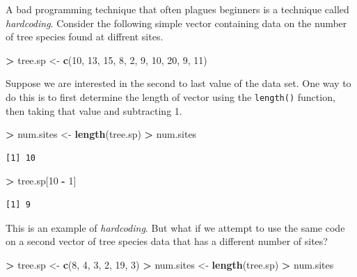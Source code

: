 \documentclass[]{krantz}
\makeatletter
\newenvironment{Shaded}{\begin{snugshade}}{\end{snugshade}}
\newcommand{\DecValTok}[1]{\textcolor[rgb]{0.06,0.06,0.06}{#1}}
\newcommand{\KeywordTok}[1]{\textcolor[rgb]{0.27,0.27,0.27}{\textbf{#1}}}
\newcommand{\NormalTok}[1]{#1}
\newcommand{\OperatorTok}[1]{\textcolor[rgb]{0.43,0.43,0.43}{\textbf{#1}}}
\newcommand{\StringTok}[1]{\textcolor[rgb]{0.5,0.5,0.5}{#1}}
\newenvironment{kframe}{%
\medskip{}
\setlength{\fboxsep}{.8em}
 \def\at@end@of@kframe{}%
 \ifinner\ifhmode%
  \def\at@end@of@kframe{\end{minipage}}%
  \begin{minipage}{\columnwidth}%
 \fi\fi%
 \def\FrameCommand##1{\hskip\@totalleftmargin \hskip-\fboxsep
 \colorbox{shadecolor}{##1}\hskip-\fboxsep
     \hskip-\linewidth \hskip-\@totalleftmargin \hskip\columnwidth}%
 \MakeFramed {\advance\hsize-\width
   \@totalleftmargin\z@ \linewidth\hsize
   \@setminipage}}%
 {\par\unskip\endMakeFramed%
 \at@end@of@kframe}
\renewenvironment{Shaded}{\begin{kframe}}{\end{kframe}}
\makeatother
\begin{document}
A bad programming technique that often plagues beginners is a technique called \emph{hardcoding}. Consider the following simple vector containing data on the number of tree species found at diffrent sites.

\begin{Shaded}
\begin{Highlighting}[]
\OperatorTok{>}\StringTok{ }\NormalTok{tree.sp <-}\StringTok{ }\KeywordTok{c}\NormalTok{(}\DecValTok{10}\NormalTok{, }\DecValTok{13}\NormalTok{, }\DecValTok{15}\NormalTok{, }\DecValTok{8}\NormalTok{, }\DecValTok{2}\NormalTok{, }\DecValTok{9}\NormalTok{, }\DecValTok{10}\NormalTok{, }\DecValTok{20}\NormalTok{, }\DecValTok{9}\NormalTok{, }\DecValTok{11}\NormalTok{)}
\end{Highlighting}
\end{Shaded}

Suppose we are interested in the second to last value of the data set. One way to do this is to first determine the length of vector using the \texttt{length()} function, then taking that value and subtracting 1.

\begin{Shaded}
\begin{Highlighting}[]
\OperatorTok{>}\StringTok{ }\NormalTok{num.sites <-}\StringTok{ }\KeywordTok{length}\NormalTok{(tree.sp)}
\OperatorTok{>}\StringTok{ }\NormalTok{num.sites}
\end{Highlighting}
\end{Shaded}

\begin{verbatim}
[1] 10
\end{verbatim}

\begin{Shaded}
\begin{Highlighting}[]
\OperatorTok{>}\StringTok{ }\NormalTok{tree.sp[}\DecValTok{10} \OperatorTok{-}\StringTok{ }\DecValTok{1}\NormalTok{]}
\end{Highlighting}
\end{Shaded}

\begin{verbatim}
[1] 9
\end{verbatim}

This is an example of \emph{hardcoding}. But what if we attempt to use the same code on a second vector of tree species data that has a different number of sites?

\begin{Shaded}
\begin{Highlighting}[]
\OperatorTok{>}\StringTok{ }\NormalTok{tree.sp <-}\StringTok{ }\KeywordTok{c}\NormalTok{(}\DecValTok{8}\NormalTok{, }\DecValTok{4}\NormalTok{, }\DecValTok{3}\NormalTok{, }\DecValTok{2}\NormalTok{, }\DecValTok{19}\NormalTok{, }\DecValTok{3}\NormalTok{)}
\OperatorTok{>}\StringTok{ }\NormalTok{num.sites <-}\StringTok{ }\KeywordTok{length}\NormalTok{(tree.sp)}
\OperatorTok{>}\StringTok{ }\NormalTok{num.sites}
\end{Highlighting}
\end{Shaded}
\end{document}
